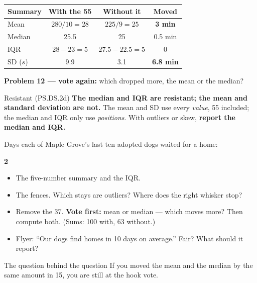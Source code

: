 \documentclass[aspectratio=169, 11pt]{beamer}
\newcommand{\redink}[1]{{\color{redacc}\bfseries #1}}
\begin{document}
\begin{frame}[t, plain]
  \begin{center}
    \small
    \renewcommand{\arraystretch}{1.25}
    \begin{tabular}{@{} l c c c @{}}
    \hline
    \textbf{Summary} & \textbf{With the 55} & \textbf{Without it} & \textbf{Moved} \\
    \hline
    Mean     & $280/10 = 28$ & $225/9 = 25$ & \redink{3 min} \\
    Median   & 25.5 & 25 & 0.5 min \\
    IQR      & $28 - 23 = 5$ & $27.5 - 22.5 = 5$ & 0 \\
    SD ($s$) & 9.9 & 3.1 & \redink{6.8 min} \\
    \hline
    \end{tabular}
  \end{center}
  \vspace{2pt}
  \textbf{Problem 12 --- vote again:} which dropped more, the mean or the median?
  \begin{block}{Resistant (PS.DS.2d)}
    \textbf{The median and IQR are resistant; the mean and standard deviation are not.} The
    mean and SD use every \emph{value}, 55 included; the median and IQR only use
    \emph{positions}. With outliers or skew, \redink{report the median and IQR.}
  \end{block}
\end{frame}

\begin{frame}[t, plain]
  Days each of Maple Grove's last ten adopted dogs waited for a home:
  \begin{center}
    \textbf{2         }
  \end{center}
  \begin{itemize}\setlength{\itemsep}{4pt}
    \item[13.] The five-number summary and the IQR.
    \item[14.] The fences. Which stays are outliers? Where does the right whisker stop?
    \item[15.] Remove the 37. \textbf{Vote first:} mean or median --- which moves more? Then
          compute both. (Sums: 100 with, 63 without.)
    \item[16.] Flyer: ``Our dogs find homes in 10 days on average.'' Fair? What should it report?
  \end{itemize}
  \begin{block}{The question behind the question}
    If you moved the mean and the median by the same amount in 15, you are still at the hook
    vote.
  \end{block}
\end{frame}
\end{document}
